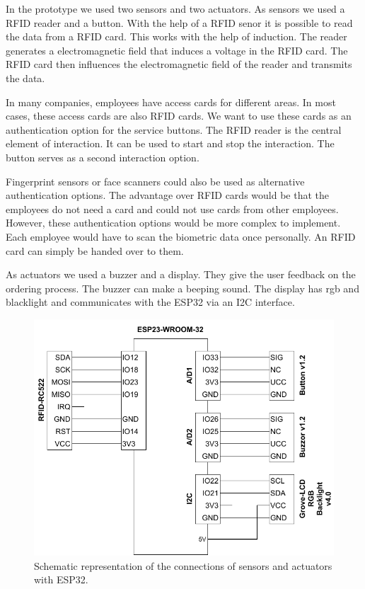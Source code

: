In the prototype we used two sensors and two actuators. As sensors we used a RFID reader and a button. With the help of a RFID senor it is possible to read the data from a RFID card. This works with the help of induction. The reader generates a electromagnetic field that induces a voltage in the RFID card. The RFID card then influences the electromagnetic field of the reader and transmits the data. \cite{Adryan:TechFound-Components:2017}

In many companies, employees have access cards for different areas. In most cases, these access cards are also RFID cards. We want to use these cards as an authentication option for the service buttons. The RFID reader is the central element of interaction. It can be used to start and stop the interaction. The button serves as a second interaction option.

Fingerprint sensors or face scanners could also be used as alternative authentication options. The advantage over RFID cards would be that the employees do not need a card and could not use cards from other employees. However, these authentication options would be more complex to implement. Each employee would have to scan the biometric data once personally. An RFID card can simply be handed over to them. 

As actuators we used a buzzer and a display. They give the user feedback on the ordering process. The buzzer can make a beeping sound. The display has rgb and blacklight and communicates with the ESP32 via an I2C interface.

\begin{figure}
    \center
    \includegraphics[width=\linewidth]{figures/schematics.drawio.pdf}
    \caption{Schematic representation of the connections of sensors and actuators with ESP32.}
    \label{fig:schematics}
\end{figure}

